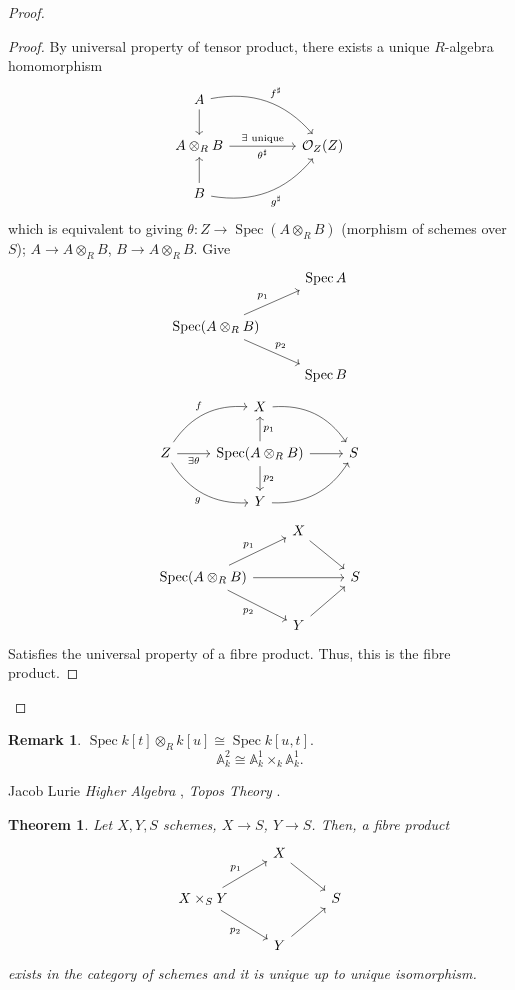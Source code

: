 \documentclass[12pt]{article}
\DeclareMathOperator{\Spec}{Spec}
\newtheorem*{theorem}{Theorem}
\theoremstyle{definition}
\newtheorem*{remark}{Remark}
\theoremstyle{remark}
\begin{document}
\begin{proof}
\begin{itemize}[label=$-$]
\begin{proof}
By universal property of tensor product, there exists a unique $R$-algebra homomorphism
\[
\begin{tikzcd}
A\arrow[rrd,"f^{\sharp}",bend left]\arrow[d]\\
A\otimes_RB\arrow[rr,"\exists\text{ unique}","\theta^{\sharp}"']&&\mathcal{O}_Z(Z)\\
B\arrow[u]\arrow[rru,"g^{\sharp}",swap,bend right]
\end{tikzcd}
\]
which is equivalent to giving $\theta:Z\rightarrow\Spec(A\otimes_RB)$ (morphism of schemes over $S$); $A\rightarrow A\otimes_RB$, $B\rightarrow A\otimes_RB$. Give
\[
\begin{tikzcd}
&\Spec A\\
\Spec(A\otimes_RB)\arrow[ru,"p_1"]\arrow[rd,"p_2"]\\
&\Spec B
\end{tikzcd}
\]
\[
\begin{tikzcd}
&X\arrow[rd,bend left]\\
Z\arrow[ru,"f",bend left]\arrow[r,"\exists\theta",swap]\arrow[rd,"g",bend right,swap]&\Spec(A\otimes_RB)\arrow[u,"p_1",swap]\arrow[r]\arrow[d,"p_2"]&S\\
&Y\arrow[ru,bend right]
\end{tikzcd}
\]
\[
\begin{tikzcd}
&X\arrow[rd]\\
\Spec(A\otimes_RB)\arrow[ru,"p_1"]\arrow[rd,"p_2",swap]\arrow[rr]&&S\\
&Y\arrow[ru]
\end{tikzcd}
\]
Satisfies the universal property of a fibre product. Thus, this is the fibre product.
\end{proof}
\end{itemize}
\end{proof}

\begin{remark}
$\Spec k[t]\otimes_Rk[u]\cong\Spec k[u,t]$.
\[\mathbb{A}_k^2\cong\mathbb{A}_k^1\times_k\mathbb{A}_k^1.\]
\end{remark}

Jacob Lurie \emph{Higher Algebra} \cite{lurie2017higher}, \emph{Topos Theory} \cite{lurie2009higher}.

\begin{theorem}
Let $X,Y,S$ schemes, $X\rightarrow S$, $Y\rightarrow S$. Then, a fibre product
\[
\begin{tikzcd}
&X\arrow[rd]\\
X\times_SY\arrow[ru,"p_1"]\arrow[rd,"p_2",swap]&&S\\
&Y\arrow[ru]
\end{tikzcd}
\]
exists in the category of schemes and it is unique up to unique isomorphism.
\end{theorem}
\end{document}
